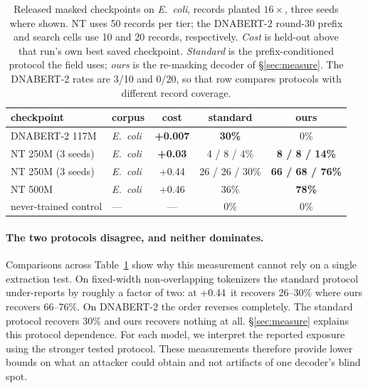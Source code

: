 \begin{table}[tbp]
\centering
\caption{Released masked checkpoints on \emph{E.~coli}, records planted $16\times$, three seeds where shown. NT uses 50 records per tier;
the DNABERT-2 round-30 prefix and search cells use 10 and 20 records, respectively. \emph{Cost} is held-out \bits{} above that run's own best saved
checkpoint. \emph{Standard} is the prefix-conditioned protocol the field uses; \emph{ours} is the
re-masking decoder of \S\ref{sec:measure}. The DNABERT-2 rates are 3/10 and 0/20,
so that row compares protocols with different record coverage.}
\label{tab:cost}
\begin{tabular}{llccc}
\toprule
checkpoint & corpus & cost & standard & ours \\
\midrule
DNABERT-2 117M      & \emph{E.~coli} & \textbf{+0.007} & \textbf{30\%}      & 0\% \\
NT 250M (3 seeds)   & \emph{E.~coli} & \textbf{+0.03}  & 4 / 8 / 4\%        & \textbf{8 / 8 / 14\%} \\
NT 250M (3 seeds)   & \emph{E.~coli} & +0.44           & 26 / 26 / 30\%     & \textbf{66 / 68 / 76\%} \\
NT 500M             & \emph{E.~coli} & +0.46           & 36\%               & \textbf{78\%} \\
\midrule
never-trained control & --- & --- & 0\% & 0\% \\
\bottomrule
\end{tabular}
\end{table}

\paragraph{The two protocols disagree, and neither dominates.}
Comparisons across Table~\ref{tab:cost} show why this measurement cannot rely on a single extraction
test. On fixed-width non-overlapping tokenizers the standard protocol under-reports by
roughly a factor of two: at +0.44\,\bits{} it recovers 26--30\% where ours recovers 66--76\%. On
DNABERT-2 the order reverses completely. The standard protocol recovers 30\% and ours recovers
nothing at all. \S\ref{sec:measure} explains this protocol dependence. For each model, we interpret the reported exposure
using the stronger tested protocol. These measurements therefore provide lower bounds on what an attacker could obtain and not artifacts of one decoder's blind spot.

